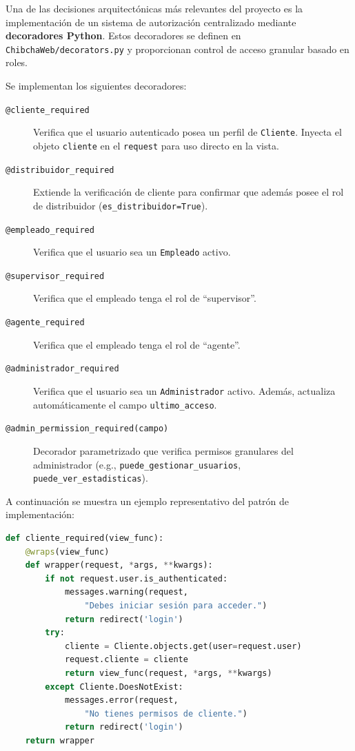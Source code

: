 \documentclass[12pt, a4paper]{article}
\begin{document}
Una de las decisiones arquitectónicas más relevantes del proyecto es la implementación de un sistema de autorización centralizado mediante \textbf{decoradores Python}. Estos decoradores se definen en \texttt{ChibchaWeb/decorators.py} y proporcionan control de acceso granular basado en roles.

Se implementan los siguientes decoradores:

\begin{description}
    \item[\texttt{@cliente\_required}] Verifica que el usuario autenticado posea un perfil de \texttt{Cliente}. Inyecta el objeto \texttt{cliente} en el \texttt{request} para uso directo en la vista.
    \item[\texttt{@distribuidor\_required}] Extiende la verificación de cliente para confirmar que además posee el rol de distribuidor (\texttt{es\_distribuidor=True}).
    \item[\texttt{@empleado\_required}] Verifica que el usuario sea un \texttt{Empleado} activo.
    \item[\texttt{@supervisor\_required}] Verifica que el empleado tenga el rol de ``supervisor''.
    \item[\texttt{@agente\_required}] Verifica que el empleado tenga el rol de ``agente''.
    \item[\texttt{@administrador\_required}] Verifica que el usuario sea un \texttt{Administrador} activo. Además, actualiza automáticamente el campo \texttt{ultimo\_acceso}.
    \item[\texttt{@admin\_permission\_required(campo)}] Decorador parametrizado que verifica permisos granulares del administrador (e.g., \texttt{puede\_gestionar\_usuarios}, \texttt{puede\_ver\_estadisticas}).
\end{description}

A continuación se muestra un ejemplo representativo del patrón de implementación:

\begin{lstlisting}[language=Python, caption={Decorador @cliente\_required (ChibchaWeb/decorators.py)}]
def cliente_required(view_func):
    @wraps(view_func)
    def wrapper(request, *args, **kwargs):
        if not request.user.is_authenticated:
            messages.warning(request,
                "Debes iniciar sesión para acceder.")
            return redirect('login')
        try:
            cliente = Cliente.objects.get(user=request.user)
            request.cliente = cliente
            return view_func(request, *args, **kwargs)
        except Cliente.DoesNotExist:
            messages.error(request,
                "No tienes permisos de cliente.")
            return redirect('login')
    return wrapper
\end{lstlisting}
\end{document}

